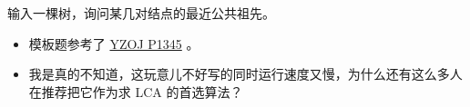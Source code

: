 \noindent 输入一棵树，询问某几对结点的最近公共祖先。

\begin{itemize}
    \item 模板题参考了 \href{https://oiproxy.bugminer.top/OnlineJudge/problem_show.php?id=1345}{YZOJ P1345} 。
    \item 我是真的不知道，这玩意儿不好写的同时运行速度又慢，为什么还有这么多人在推荐把它作为求 LCA 的首选算法？
\end{itemize}